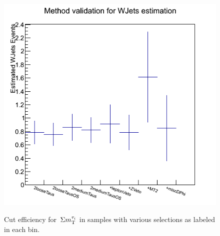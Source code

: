 \begin{figure}[htbp]
\includegraphics[angle=0,scale=0.35]{TauTauFigs/WJetsEst_bin2_BJetVetoApplied.png} \\
\caption{Cut efficiency for %
$\,\Sigma m_{\rm T}^{\tau_i}$ %
in samples with various selections as labeled in each bin.}
\label{fig:justification_bin2}
\end{figure}


